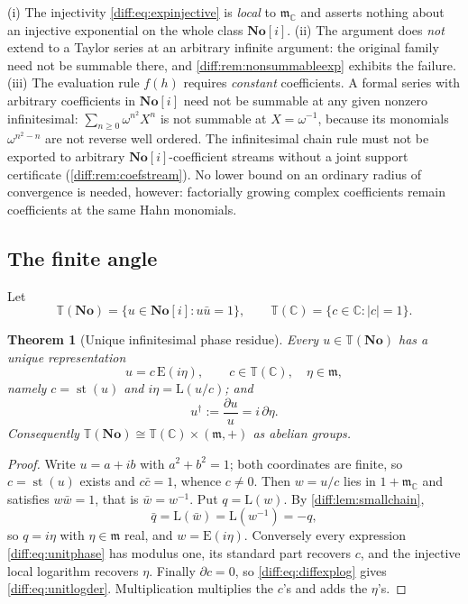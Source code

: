 \documentclass[11pt,letterpaper]{article}
\numberwithin{equation}{section}
\newtheorem{theorem}{Theorem}[section]
\theoremstyle{definition}
\theoremstyle{remark}
\newcommand{\No}{\mathbf{No}}
\newcommand{\SC}{\mathbf{No}[i]}
\newcommand{\C}{\mathbb C}
\newcommand{\der}{\partial}
\newcommand{\mm}{\mathfrak m}
\newcommand{\st}{\operatorname{st}}
\newcommand{\Emm}{\mathrm{E}}
\newcommand{\Lmm}{\mathrm{L}}
\newcommand{\Tor}{\mathbb T}
\newcommand{\abs}[1]{\lvert#1\rvert}
\begin{document}
\begin{warning}
\label{diff:warn:smallexplimits}
(i) The injectivity \cref{diff:eq:expinjective} is \emph{local} to $\mm_{\C}$
and asserts nothing about an injective exponential on the whole class $\SC$.
(ii) The argument does \emph{not} extend to a Taylor series at an arbitrary
infinite argument: the original family need not be summable there, and
\cref{diff:rem:nonsummableexp} exhibits the failure. (iii) The evaluation rule
$f(h)$ requires \emph{constant} coefficients. A formal series with arbitrary
coefficients in $\SC$ need not be summable at any given nonzero infinitesimal:
$\sum_{n\geq0}\omega^{n^{2}}X^{n}$ is not summable at $X=\omega^{-1}$, because
its monomials $\omega^{n^{2}-n}$ are not reverse well ordered. The
infinitesimal chain rule must not be exported to arbitrary
$\SC$-coefficient streams without a joint support certificate
(\cref{diff:rem:coefstream}). No lower bound on an ordinary radius of
convergence is needed, however: factorially growing complex coefficients
remain coefficients at the same Hahn monomials.
\end{warning}

\subsection{The finite angle}
\label{diff:sub:cis}

Let
\[
 \Tor(\No)=\{u\in\SC:u\bar u=1\},
 \qquad
 \Tor(\C)=\{c\in\C:\abs c=1\}.
\]

\begin{theorem}[Unique infinitesimal phase residue]
\label{diff:thm:unitphase}
Every $u\in\Tor(\No)$ has a unique representation
\begin{equation}\label{diff:eq:unitphase}
 u=c\,\Emm(i\eta),\qquad c\in\Tor(\C),\quad\eta\in\mm,
\end{equation}
namely $c=\st(u)$ and $i\eta=\Lmm(u/c)$; and
\begin{equation}\label{diff:eq:unitlogder}
 u^{\dagger}:=\frac{\der u}{u}=i\,\der\eta .
\end{equation}
Consequently $\Tor(\No)\cong\Tor(\C)\times(\mm,+)$ as abelian groups.
\end{theorem}
\begin{proof}
Write $u=a+ib$ with $a^{2}+b^{2}=1$; both coordinates are finite, so
$c=\st(u)$ exists and $c\bar c=1$, whence $c\neq0$. Then $w=u/c$ lies in
$1+\mm_{\C}$ and satisfies $w\bar w=1$, that is $\bar w=w^{-1}$. Put
$q=\Lmm(w)$. By \cref{diff:lem:smallchain},
\[
 \bar q=\Lmm(\bar w)=\Lmm(w^{-1})=-q,
\]
so $q=i\eta$ with $\eta\in\mm$ real, and $w=\Emm(i\eta)$. Conversely every
expression \cref{diff:eq:unitphase} has modulus one, its standard part recovers
$c$, and the injective local logarithm recovers $\eta$. Finally $\der c=0$, so
\cref{diff:eq:diffexplog} gives \cref{diff:eq:unitlogder}. Multiplication
multiplies the $c$'s and adds the $\eta$'s.
\end{proof}
\end{document}
